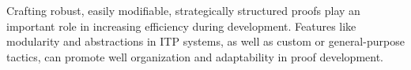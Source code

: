 
Crafting robust, easily modifiable, strategically structured proofs play an important role in increasing efficiency during development. Features like modularity and abstractions in ITP systems, as well as custom or general-purpose tactics, can promote well organization and adaptability in proof development. \\

